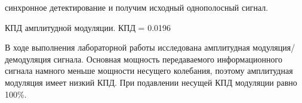 \documentclass[a4paper,12pt]{article}
\begin{document}
\begin{enumerate}
{ синхронное детектирование и получим исходный однополосный сигнал.
\\}

{ КПД амплитудной модуляции.
КПД = 0.0196
\\}

{\bfseries{}}

В ходе выполнения лабораторной работы исследована амплитудная модуляция/демодуляция сигнала. Основная мощность передаваемого информационного сигнала намного меньше мощности несущего колебания, поэтому амплитудная модуляция имеет низкий КПД. При подавлении несущей КПД модуляции равно 100\%.

\end{enumerate}
\end{document}
